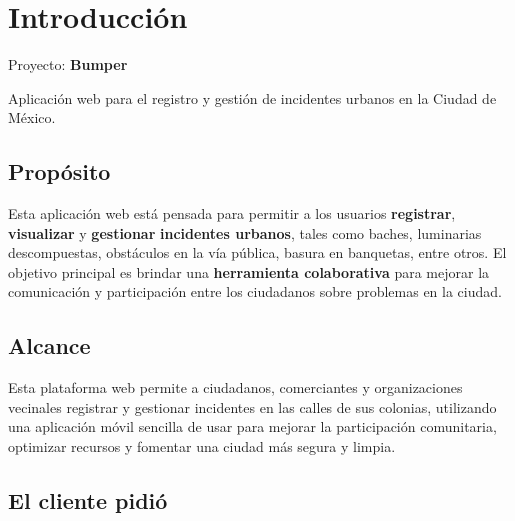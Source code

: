 \section{Introducción}

Proyecto: \textbf{Bumper}

Aplicación web para el registro y gestión de incidentes urbanos en la Ciudad de México.

\subsection{Propósito}

Esta aplicación web está pensada para permitir a los usuarios \textbf{registrar}, \textbf{visualizar} y \textbf{gestionar} \textbf{incidentes urbanos}, tales como baches, luminarias descompuestas, obstáculos en la vía pública, basura en banquetas, entre otros. El objetivo principal es brindar una \textbf{herramienta colaborativa} para mejorar la comunicación y participación entre los ciudadanos sobre problemas en la ciudad. 

\subsection{Alcance}

Esta plataforma web permite a ciudadanos, comerciantes y organizaciones vecinales registrar y gestionar incidentes en las calles de sus colonias, utilizando una aplicación móvil sencilla de usar para mejorar la participación comunitaria, optimizar recursos y fomentar una ciudad más segura y limpia.

\subsection{El cliente pidió}

